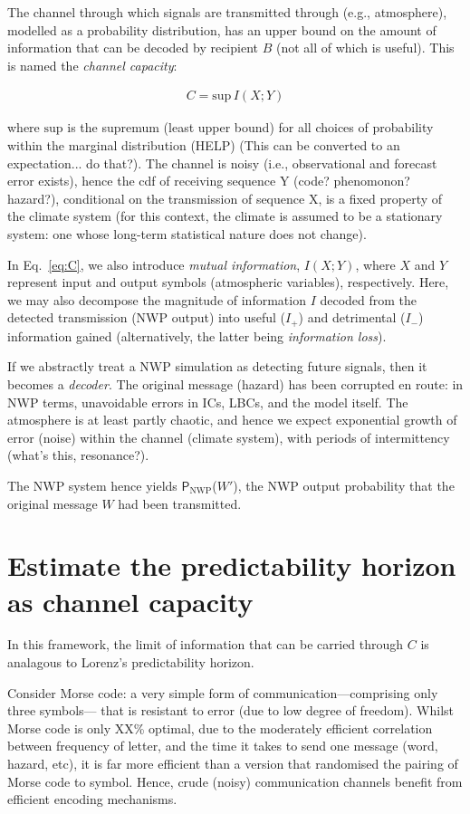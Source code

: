 \documentclass{ametsoc}
\newcommand*{\probnwp}{$\mathsf{P}_{\textrm{NWP}}$}
\begin{document}
The channel through which signals are transmitted through (e.g., atmosphere), modelled as a probability distribution, has an upper bound on the amount of information that can be decoded by recipient $B$ (not all of which is useful). This is named the \emph{channel capacity}:

\begin{align}\label{eq:C}
    C =  \textrm{sup}\,I(X;Y)
\end{align}

where $\textrm{sup}$ is the supremum (least upper bound) for all choices of probability within the marginal distribution (HELP) (This can be converted to an expectation... do that?). The channel is noisy (i.e., observational and forecast error exists), hence the cdf of receiving sequence Y (code? phenomonon? hazard?), conditional on the transmission of sequence X, is a fixed property of the climate system (for this context, the climate is assumed to be a stationary system: one whose long-term statistical nature does not change). 

In Eq.~\ref{eq:C}, we also introduce \emph{mutual information}, $I(X;Y)$, where $X$ and $Y$ represent input and output symbols (atmospheric variables), respectively. Here, we may also decompose the magnitude of information $I$ decoded from the detected transmission (NWP output) into useful ($I_{+}$) and detrimental ($I_{-}$) information gained (alternatively, the latter being \emph{information loss}).

If we abstractly treat a NWP simulation as detecting future signals, then it becomes a \emph{decoder}. The original message (hazard) has been corrupted en route: in NWP terms, unavoidable errors in ICs, LBCs, and the model itself. The atmosphere is at least partly chaotic, and hence we expect exponential growth of error (noise) within the channel (climate system), with periods of intermittency (what's this, resonance?).

The NWP system hence yields \probnwp($W'$), the NWP output probability that the original message $W$ had been transmitted.

\section{Estimate the predictability horizon as channel capacity}
In this framework, the limit of information that can be carried through $C$ is analagous to Lorenz's predictability horizon. 

Consider Morse code: a very simple form of communication---comprising only three symbols--- that is resistant to error (due to low degree of freedom). Whilst Morse code is only XX\% optimal, due to the moderately efficient correlation between frequency of letter, and the time it takes to send one message (word, hazard, etc), it is far more efficient than a version that randomised the pairing of Morse code to symbol. Hence, crude (noisy) communication channels benefit from efficient encoding mechanisms. 
\end{document}
